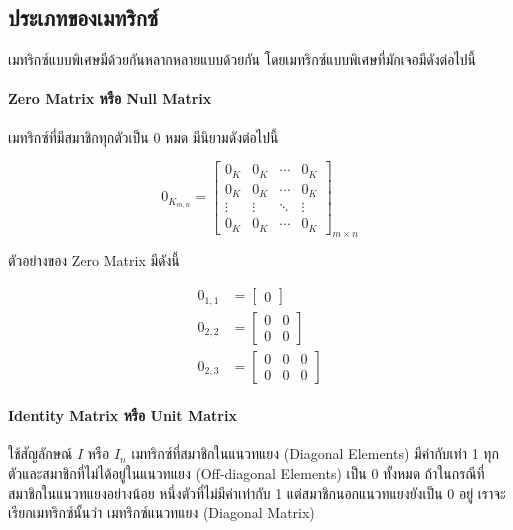 \subsection{ประเภทของเมทริกซ์}

เมทริกซ์แบบพิเศษมีด้วยกันหลากหลายแบบด้วยกัน โดยเมทริกซ์แบบพิเศษที่มักเจอมีดังต่อไปนี้

\paragraph{Zero Matrix หรือ Null Matrix} เมทริกซ์ที่มีสมาชิกทุกตัวเป็น 0 หมด มีนิยามดังต่อไปนี้

\begin{equation}
    0_{K_{m,n}} = 
    \begin{bmatrix}
    0_K & 0_K & \cdots & 0_K \\
    0_K & 0_K & \cdots & 0_K \\
    \vdots & \vdots & \ddots  & \vdots \\
    0_K & 0_K & \cdots & 0_K 
    \end{bmatrix}_{m \times n}
\end{equation}

\noindent ตัวอย่างของ Zero Matrix มีดังนี้

\begin{align}
    0_{1,1} &= \begin{bmatrix}
    0 \end{bmatrix}
    \\
    0_{2,2} &= \begin{bmatrix}
    0 & 0 \\
    0 & 0 \end{bmatrix}
    \\
    0_{2,3} &= \begin{bmatrix}
    0 & 0 & 0 \\
    0 & 0 & 0 \end{bmatrix}
\end{align}

\paragraph{Identity Matrix หรือ Unit Matrix} ใช้สัญลักษณ์ $I$ หรือ $I_{n}$ เมทริกซ์ที่สมาชิกในแนวทแยง (Diagonal Elements) 
มีค่ากับเท่า 1 ทุกตัวและสมาชิกที่ไม่ได้อยู่ในแนวทแยง (Off-diagonal Elements) เป็น 0 ทั้งหมด ถ้าในกรณีที่สมาชิกในแนวทแยงอย่างน้อย%
หนึ่งตัวที่ไม่มีค่าเท่ากับ 1 แต่สมาชิกนอกแนวทแยงยังเป็น 0 อยู่ เราจะเรียกเมทริกซ์นั้นว่า เมทริกซ์แนวทแยง (Diagonal Matrix)

